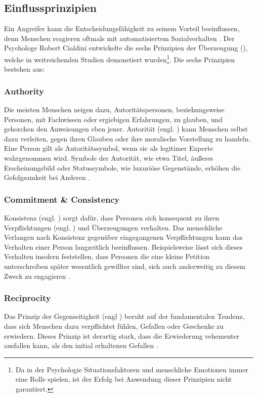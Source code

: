 \subsection{Einflussprinzipien}

Ein Angreifer kann die Entscheidungsfähigkeit zu seinem Vorteil beeinflussen, denn Menschen reagieren oftmals mit automatisiertem Sozialverhalten .
Der Psychologe Robert Cialdini entwickelte die sechs Prinzipien der Überzeugung (),
welche in weitreichenden Studien demonstiert wurden\footnote{Da in der Psychologie Situationsfaktoren und menschliche Emotionen immer eine Rolle spielen, ist der Erfolg bei Anwendung dieser Prinzipien nicht garantiert.}.
Die sechs Prinzipien bestehen aus:

\subsubsection{Authority}
Die meisten Menschen neigen dazu, Autoritätspersonen, beziehungsweise Personen, mit Fachwissen oder ergiebigen Erfahrungen, zu glauben, und gehorchen den Anweisungen eben jener.
Autorität (engl. ) kann Menschen selbst dazu verleiten, gegen ihren Glauben oder ihre moralische Vorstellung zu handeln.
Eine Person gilt als Autoritätssymbol, wenn sie als legitimer Experte wahrgenommen wird. Symbole der Autorität, wie etwa Titel, äu\ss eres Erscheinungsbild oder Statussymbole, wie
luxuriöse Gegenstände, erhöhen die Gefolgsamkeit bei Anderen .

\subsubsection{Commitment \& Consistency}
Konsistenz (engl. ) sorgt dafür, dass Personen sich konsequent zu ihren Verpflichtungen (engl. ) und Überzeugungen verhalten.
Das menschliche Verlangen nach Konsistenz gegenüber eingegangenen Verpflichtungen kann das Verhalten einer Person langzeitlich beeinflussen.
Beispielsweise lässt sich dieses Verhalten insofern feststellen, dass Personen die eine kleine Petition unterschreiben später wesentlich gewillter sind, sich auch anderweitig zu diesem Zweck zu engagieren .

\subsubsection{Reciprocity}
Das Prinzip der Gegenseitigkeit (engl ) beruht auf der fundamentalen Tendenz, dass sich Menschen dazu verpflichtet fühlen, Gefallen oder Geschenke zu erwiedern.
Dieses Prinzip ist derartig stark, dass die Erwiederung vehementer ausfallen kann, als den initial erhaltenen Gefallen .

